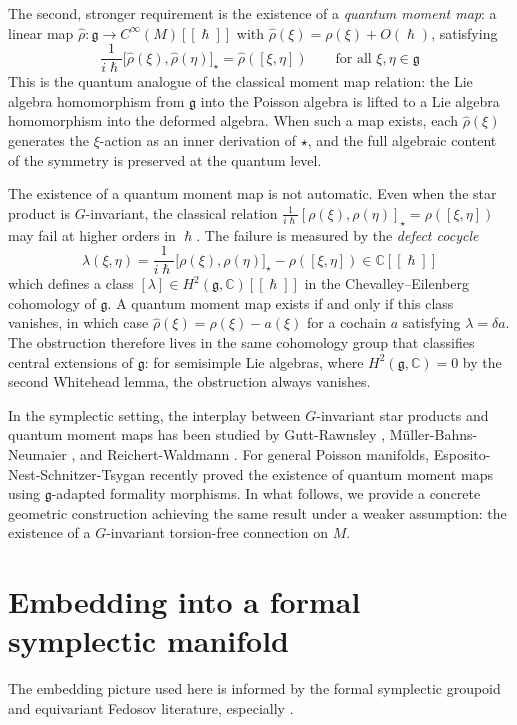 \documentclass[
  12pt,
  a4paper, oneside
]{report}
\renewcommand{\hbar}{\hslash}
\theoremstyle{bolddef}
\theoremstyle{remark}
\numberwithin{equation}{chapter}
\begin{document}
The second, stronger requirement is the existence of a \emph{quantum moment map}: a linear map $\hat{\rho} : \mathfrak{g} \to C^\infty(M)[[\hbar]]$ with $\hat{\rho}(\xi) = \rho(\xi) + O(\hbar)$, satisfying
\begin{equation}\label{eq:qmm-def}
\frac{1}{i\hbar}\big[\hat{\rho}(\xi), \hat{\rho}(\eta)\big]_\star = \hat{\rho}([\xi, \eta]) \qquad \text{for all } \xi, \eta \in \mathfrak{g}
\end{equation}
This is the quantum analogue of the classical moment map relation: the Lie algebra homomorphism from $\mathfrak{g}$ into the Poisson algebra is lifted to a Lie algebra homomorphism into the deformed algebra. When such a map exists, each $\hat{\rho}(\xi)$ generates the $\xi$-action as an inner derivation of $\star$, and the full algebraic content of the symmetry is preserved at the quantum level.

The existence of a quantum moment map is not automatic. Even when the star product is $G$-invariant, the classical relation $\frac{1}{i\hbar}[\rho(\xi), \rho(\eta)]_\star = \rho([\xi, \eta])$ may fail at higher orders in $\hbar$. The failure is measured by the \emph{defect cocycle}
\[
\lambda(\xi, \eta) = \frac{1}{i\hbar}\big[\rho(\xi), \rho(\eta)\big]_\star - \rho([\xi, \eta]) \in \mathbb{C}[[\hbar]]
\]
which defines a class $[\lambda] \in H^2(\mathfrak{g}, \mathbb{C})[[\hbar]]$ in the Chevalley--Eilenberg cohomology of $\mathfrak{g}$. A quantum moment map exists if and only if this class vanishes, in which case $\hat{\rho}(\xi) = \rho(\xi) - a(\xi)$ for a cochain $a$ satisfying $\lambda = \delta a$. The obstruction therefore lives in the same cohomology group that classifies central extensions of $\mathfrak{g}$: for semisimple Lie algebras, where $H^2(\mathfrak{g}, \mathbb{C}) = 0$ by the second Whitehead lemma, the obstruction always vanishes.

In the symplectic setting, the interplay between $G$-invariant star products and quantum moment maps has been studied by Gutt-Rawnsley \cite{GR}, M\"uller-Bahns-Neumaier \cite{MBN}, and Reichert-Waldmann \cite{RW}. For general Poisson manifolds, Esposito-Nest-Schnitzer-Tsygan \cite{ENST} recently proved the existence of quantum moment maps using $\mathfrak{g}$-adapted formality morphisms. In what follows, we provide a concrete geometric construction achieving the same result under a weaker assumption: the existence of a $G$-invariant torsion-free connection on $M$.
\section*{Embedding into a formal symplectic manifold}
The embedding picture used here is informed by the formal symplectic groupoid and equivariant Fedosov literature, especially \cite{GR,MBN,RW,ENST}.
\end{document}
